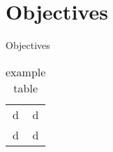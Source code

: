 \documentclass[../PhD_Dissertation.tex]{subfiles}
\begin{document}
\chapter{Objectives}
Objectives

\begin{table}[t]
    \centering
    \begin{tabular}{c|c}
        d &d  \\
       d  & d
    \end{tabular}
    \caption{example table}
    \label{tab:my_label}
\end{table}
\end{document}
